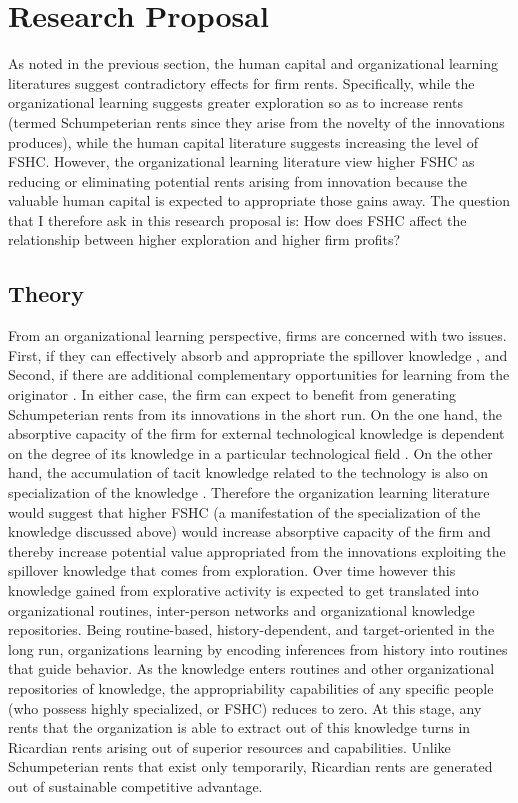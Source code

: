 \documentclass[12pt,letterpaper]{article}
\begin{document}
\section{Research Proposal}
As noted in the previous section, the human capital and organizational learning literatures suggest contradictory effects for firm rents. Specifically, while the organizational learning suggests greater exploration so as to increase rents (termed Schumpeterian rents since they arise from the novelty of the innovations produces), while the human capital literature suggests increasing the level of FSHC. However, the organizational learning literature view higher FSHC as reducing or eliminating potential rents arising from innovation because the valuable human capital is expected to appropriate those gains away.  The question that I therefore ask in this research proposal is: How does FSHC affect the relationship between higher exploration and higher firm profits?

\subsection{Theory}
From an organizational learning perspective, firms are concerned with two issues. First, if they can effectively absorb and appropriate the spillover knowledge \citep{Cohen1990}, and Second, if there are additional complementary opportunities for learning from the originator \citep{Teece1986}. In either case, the firm can expect to benefit from generating Schumpeterian rents from its innovations in the short run. On the one hand, the absorptive capacity of the firm for external technological knowledge is dependent on the degree of its knowledge in a particular technological field \citep{Schoenmakers2006}. On the other hand, the accumulation of tacit knowledge \citep{Polanyi1966} related to the technology is also on specialization of the knowledge \citep{Enright1991}. Therefore the organization learning literature would suggest that higher FSHC (a manifestation of the specialization of the knowledge discussed above) would increase absorptive capacity of the firm and thereby increase potential value appropriated from the innovations exploiting the spillover knowledge that comes from exploration. Over time however this knowledge gained from explorative activity is expected to get translated into organizational routines, inter-person networks and organizational knowledge repositories. Being routine-based, history-dependent, and target-oriented in the long run, organizations  learning by encoding inferences from history into routines that guide behavior. As the knowledge enters routines and other organizational repositories of knowledge, the appropriability capabilities of any specific people (who possess highly specialized, or FSHC) reduces to zero. At this stage, any rents that the organization is able to extract out of this knowledge turns in Ricardian rents arising out of superior resources and capabilities. Unlike Schumpeterian rents that exist only temporarily, Ricardian rents are generated out of sustainable competitive advantage.
\end{document}
